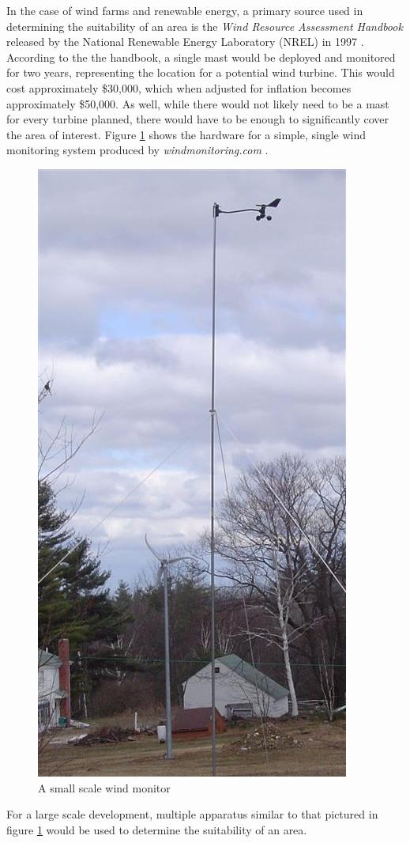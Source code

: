 \documentclass[12pt]{report}
\begin{document}
	In the case of wind farms and renewable energy, a primary source used in determining the suitability of an area is the \emph{Wind Resource Assessment Handbook} released by the National Renewable Energy Laboratory (NREL) in 1997 \cite{Bailey97}. According to the the handbook, a single mast would be deployed and monitored for two years, representing the location for a potential wind turbine. This would cost approximately \$30,000, which when adjusted for inflation becomes approximately \$50,000. As well, while there would not likely need to be a mast for every turbine planned, there would have to be enough to significantly cover the area of interest. Figure \ref{fig:wind_monitor} shows the hardware for a simple, single wind monitoring system produced by \emph{windmonitoring.com} \cite{windMonitor}. 
\begin{figure}[!ht]
	\centering
	\includegraphics[scale=.6]{wind_monitoring_system.jpg}
	\caption{A small scale wind monitor \cite{windMonitor}}
	\label{fig:wind_monitor}
\end{figure}
For a large scale development, multiple apparatus similar to that pictured in figure \ref{fig:wind_monitor} would be used to determine the suitability of an area.
\end{document}
